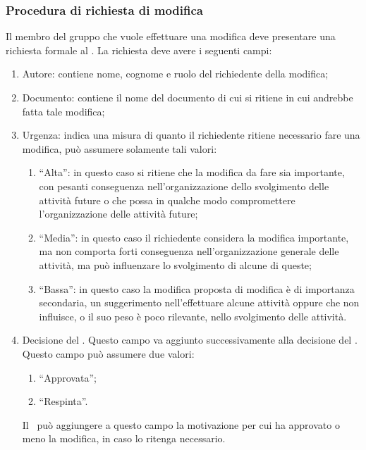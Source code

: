 \documentclass[../NormeProgetto.tex]{subfiles}
\begin{document}
		\subsubsection{Procedura di richiesta di modifica}
		Il membro del gruppo che vuole effettuare una modifica deve presentare una richiesta formale al \responsabilediprogetto. La richiesta deve avere i seguenti campi:
		\begin{enumerate}
			\item Autore: contiene nome, cognome e ruolo del richiedente della modifica;
			\item Documento: contiene il nome del documento di cui si ritiene in cui andrebbe fatta tale modifica;
			\item Urgenza: indica una misura di quanto il richiedente ritiene necessario fare una modifica, può assumere solamente tali valori:
				\begin{enumerate}
					\item ``Alta'': in questo caso si ritiene che la modifica da fare sia importante, con pesanti conseguenza nell'organizzazione dello svolgimento delle attività future o che possa in qualche modo compromettere l'organizzazione delle attività future;
					\item ``Media'': in questo caso il richiedente considera la modifica importante, ma non comporta forti conseguenza nell'organizzazione generale delle attività, ma può influenzare lo svolgimento di alcune di queste;
					\item ``Bassa'': in questo caso la modifica proposta di modifica è di importanza secondaria, un suggerimento nell'effettuare alcune attività oppure che non influisce, o il suo peso è poco rilevante, nello svolgimento delle attività.
				\end{enumerate}
			\item Decisione del \responsabilediprogetto. Questo campo va aggiunto successivamente alla decisione del \responsabilediprogetto. Questo campo può assumere due valori:
				\begin{enumerate}
					\item ``Approvata'';
					\item ``Respinta''.
				\end{enumerate}
			Il \responsabilediprogetto\ può aggiungere a questo campo la motivazione per cui ha approvato o meno la modifica, in caso lo ritenga necessario.
		\end{enumerate}
\end{document}
